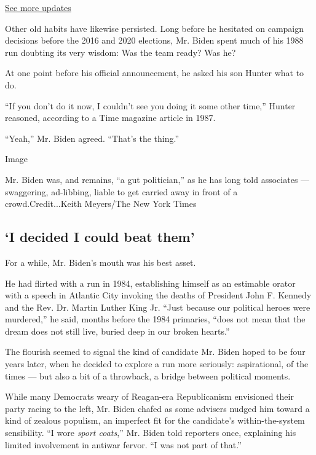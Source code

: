 \href{https://www.nytimes.com/2020/07/31/us/elections/biden-vs-trump.html?action=click\&pgtype=Article\&state=default\&region=MAIN_CONTENT_1\&context=storylines_live_updates}{See
more updates}

Other old habits have likewise persisted. Long before he hesitated on
campaign decisions before the 2016 and 2020 elections, Mr. Biden spent
much of his 1988 run doubting its very wisdom: Was the team ready? Was
he?

At one point before his official announcement, he asked his son Hunter
what to do.

``If you don't do it now, I couldn't see you doing it some other time,''
Hunter reasoned, according to a Time magazine article in 1987.

``Yeah,'' Mr. Biden agreed. ``That's the thing.''

Image

Mr. Biden was, and remains, ``a gut politician,'' as he has long told
associates --- swaggering, ad-libbing, liable to get carried away in
front of a crowd.Credit...Keith Meyers/The New York Times

\hypertarget{i-decided-i-could-beat-them}{%
\subsection{`I decided I could beat
them'}\label{i-decided-i-could-beat-them}}

For a while, Mr. Biden's mouth was his best asset.

He had flirted with a run in 1984, establishing himself as an estimable
orator with a speech in Atlantic City invoking the deaths of President
John F. Kennedy and the Rev. Dr. Martin Luther King Jr. ``Just because
our political heroes were murdered,'' he said, months before the 1984
primaries, ``does not mean that the dream does not still live, buried
deep in our broken hearts.''

The flourish seemed to signal the kind of candidate Mr. Biden hoped to
be four years later, when he decided to explore a run more seriously:
aspirational, of the times --- but also a bit of a throwback, a bridge
between political moments.

While many Democrats weary of Reagan-era Republicanism envisioned their
party racing to the left, Mr. Biden chafed as some advisers nudged him
toward a kind of zealous populism, an imperfect fit for the candidate's
within-the-system sensibility. ``I wore \emph{sport coats},'' Mr. Biden
told reporters once, explaining his limited involvement in antiwar
fervor. ``I was not part of that.''

